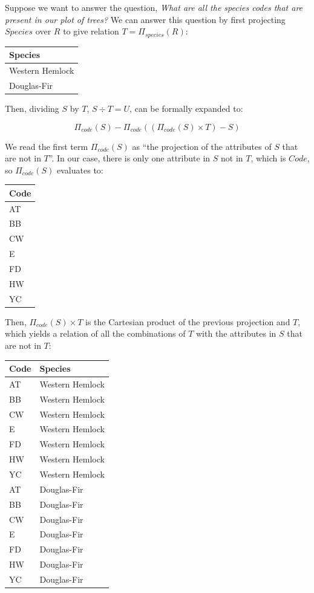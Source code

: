 \documentclass[
]{book}
\begin{document}
Suppose we want to answer the question, \emph{What are all the species codes that are present in our plot of trees?} We can answer this question by first projecting \(Species\) over \(R\) to give relation \(T=Π_{species}(R)\):

\begin{tabular}{l}
\toprule
Species\\
\midrule
Western Hemlock\\
Douglas-Fir\\
\bottomrule
\end{tabular}

Then, dividing \(S\) by \(T\), \(S÷T=U\), can be formally expanded to:

\[
Π_{code}(S) - Π_{code}((Π_{code}(S) × T) - S)
\]

We read the first term \(Π_{code}(S)\) as ``the projection of the attributes of \(S\) that are not in \(T\)''. In our case, there is only one attribute in \(S\) not in \(T\), which is \(Code\), so \(Π_{code}(S)\) evaluates to:

\begin{tabular}{l}
\toprule
Code\\
\midrule
AT\\
BB\\
CW\\
E\\
FD\\
\addlinespace
HW\\
YC\\
\bottomrule
\end{tabular}

Then, \(Π_{code}(S)×T\) is the Cartesian product of the previous projection and \(T\), which yields a relation of all the combinations of \(T\) with the attributes in \(S\) that are not in \(T\):

\begin{tabular}{ll}
\toprule
Code & Species\\
\midrule
AT & Western Hemlock\\
BB & Western Hemlock\\
CW & Western Hemlock\\
E & Western Hemlock\\
FD & Western Hemlock\\
\addlinespace
HW & Western Hemlock\\
YC & Western Hemlock\\
AT & Douglas-Fir\\
BB & Douglas-Fir\\
CW & Douglas-Fir\\
\addlinespace
E & Douglas-Fir\\
FD & Douglas-Fir\\
HW & Douglas-Fir\\
YC & Douglas-Fir\\
\bottomrule
\end{tabular}
\end{document}
